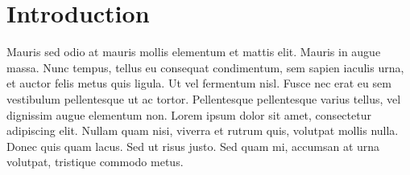 \chapter{Introduction}\label{ch:intro}

Mauris sed odio at mauris mollis elementum et mattis elit. Mauris in augue massa. Nunc tempus, tellus eu consequat condimentum, sem sapien iaculis urna, et auctor felis metus quis ligula. Ut vel fermentum nisl. Fusce nec erat eu sem vestibulum pellentesque ut ac tortor. Pellentesque pellentesque varius tellus, vel dignissim augue elementum non. Lorem ipsum dolor sit amet, consectetur adipiscing elit. Nullam quam nisi, viverra et rutrum quis, volutpat mollis nulla. Donec quis quam lacus. Sed ut risus justo. Sed quam mi, accumsan at urna volutpat, tristique commodo metus. 

